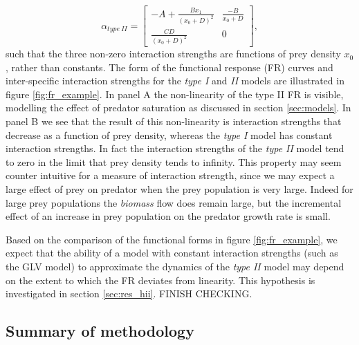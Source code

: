 \begin{equation}\label{eq:im_hii}
\alpha_{type\ II} = 
\begin{bmatrix}
-A + \frac{Bx_1}{(x_0 + D)^2} & \frac{-B}{x_0 + D} \\[10pt] \frac{CD}{(x_0 + D)^2} & 0
\end{bmatrix}  	,
\end{equation}
%
such that the three non-zero interaction strengths are functions of prey density $x_0$, rather than constants. The form of the functional response (FR) curves and inter-specific interaction strengths for the \emph{type I} and \emph{II} models are illustrated in figure \ref{fig:fr_example}. In panel A the non-linearity of the type II FR is visible, modelling the effect of predator saturation as discussed in section \ref{sec:models}. In panel B we see that the result of this non-linearity is interaction strengths that decrease as a function of prey density, whereas the \emph{type I} model has constant interaction strengths. In fact the interaction strengths of the \emph{type II} model tend to zero in the limit that prey density tends to infinity. This property may seem counter intuitive for a measure of interaction strength, since we may expect a large effect of prey on predator when the prey population is very large. Indeed for large prey populations the \emph{biomass} flow does remain large, but the incremental effect of an increase in prey population on the predator growth rate is small.

Based on the comparison of the functional forms in figure \ref{fig:fr_example}, we expect that the ability of a model with constant interaction strengths (such as the GLV model) to approximate the dynamics of the \emph{type II} model may depend on the extent to which the FR deviates from linearity. This hypothesis is investigated in section \ref{sec:res_hii}. FINISH CHECKING.

\subsection{Summary of methodology}
\label{sec:method_summary}

